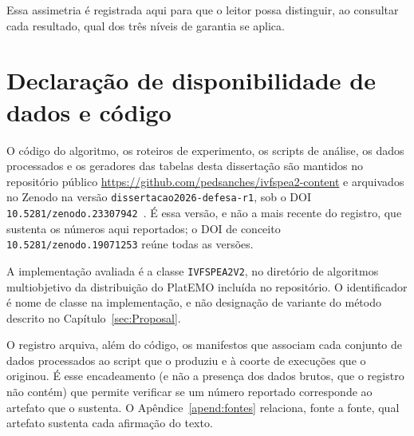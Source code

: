 Essa assimetria é registrada aqui para que o leitor possa distinguir, ao consultar cada resultado, qual dos três níveis de garantia se aplica.

\section{Declaração de disponibilidade de dados e código}
\label{sec:disponibilidade}

O código do algoritmo, os roteiros de experimento, os scripts de análise, os dados processados e os geradores das tabelas desta dissertação são mantidos no repositório público \url{https://github.com/pedsanches/ivfspea2-content} e arquivados no Zenodo na versão \texttt{dissertacao2026-defesa-r1}, sob o DOI \texttt{10.5281/zenodo.23307942}~\cite{ivfspea2github}. É essa versão, e não a mais recente do registro, que sustenta os números aqui reportados; o DOI de conceito \texttt{10.5281/zenodo.19071253} reúne todas as versões.

A implementação avaliada é a classe \texttt{IVFSPEA2V2}, no diretório de algoritmos multiobjetivo da distribuição do PlatEMO incluída no repositório. O identificador é nome de classe na implementação, e não designação de variante do método descrito no Capítulo~\ref{sec:Proposal}.

O registro arquiva, além do código, os manifestos que associam cada conjunto de dados processados ao script que o produziu e à coorte de execuções que o originou. É esse encadeamento (e não a presença dos dados brutos, que o registro não contém) que permite verificar se um número reportado corresponde ao artefato que o sustenta. O Apêndice~\ref{apend:fontes} relaciona, fonte a fonte, qual artefato sustenta cada afirmação do texto.
